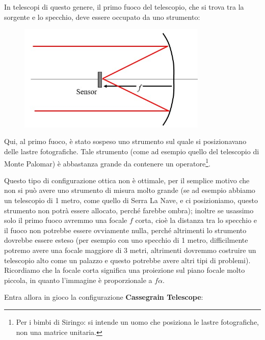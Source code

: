 In telescopi di questo genere, il primo fuoco del telescopio, che si trova tra la sorgente e lo specchio, deve essere occupato da uno strumento:

\begin{figure}[H]
    \centering
    \includegraphics[width=9cm]{1.jpg}
\end{figure}

Qui, al primo fuoco, è stato sospeso uno strumento sul quale si posizionavano delle lastre fotografiche. Tale strumento (come ad esempio quello del telescopio di Monte Palomar) è abbastanza grande da contenere un operatore\footnote{Per i bimbi di Siringo: si intende un uomo che posiziona le lastre fotografiche, non una matrice unitaria.}.

Questo tipo di configurazione ottica non è ottimale, per il semplice motivo che non si può avere uno strumento di misura molto grande (se ad esempio abbiamo un telescopio di 1 metro, come quello di Serra La Nave, e ci posizioniamo, questo strumento non potrà essere allocato, perché farebbe ombra); inoltre se usassimo solo il primo fuoco avremmo una focale $f$ corta, cioè la distanza tra lo specchio e il fuoco non potrebbe essere ovviamente nulla, perché altrimenti lo strumento dovrebbe essere esteso (per esempio con uno specchio di 1 metro, difficilmente potremo avere una focale maggiore di 3 metri, altrimenti dovremmo costruire un telescopio alto come un palazzo e questo potrebbe avere altri tipi di problemi). Ricordiamo che la focale corta significa una proiezione sul piano focale molto piccola, in quanto l'immagine è proporzionale a $f \alpha$.

Entra allora in gioco la configurazione \textbf{Cassegrain Telescope}:

